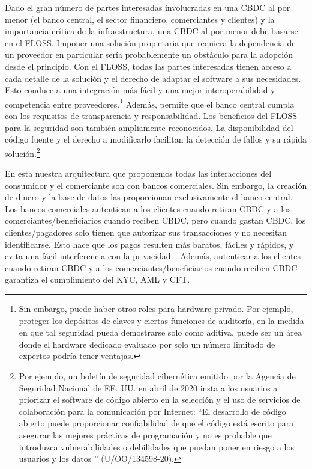 \documentclass[10pt,spanish]{article}
\begin{document}
Dado el gran número de partes interesadas involucradas en una CBDC al
por menor (el banco central, el sector financiero, comerciantes y
clientes) y la importancia crítica de la infraestructura, una CBDC al
por menor debe basarse en el FLOSS. Imponer una solución propietaria que
requiera la dependencia de un proveedor en particular sería
probablemente un obstáculo para la adopción desde el principio. Con el
FLOSS, todas las partes interesadas tienen acceso a cada detalle de la
solución y el derecho de adaptar el software a sus necesidades. Esto
conduce a una integración más fácil y una mejor interoperabilidad y
competencia entre proveedores.\footnote{Sin embargo, puede haber otros
roles para hardware privado. Por ejemplo, proteger los depósitos de
claves y ciertas funciones de auditoría, en la medida en que tal
seguridad pueda demostrarse solo como aditiva, puede ser un área donde
el hardware dedicado evaluado por solo un número limitado de expertos
podría tener ventajas.} Además, permite que el banco central cumpla
con los requisitos de transparencia y responsabilidad. Los beneficios
del FLOSS para la seguridad son también ampliamente reconocidos. La
disponibilidad del código fuente y el derecho a modificarlo facilitan la
detección de fallos y su rápida solución.\footnote{Por ejemplo, un
boletín de seguridad cibernética emitido por la Agencia de Seguridad
Nacional de EE. UU. en abril de 2020 insta a los usuarios a priorizar
el software de código abierto en la selección y el uso de servicios de
colaboración para la comunicación por Internet: ``El desarrollo de
código abierto puede proporcionar confiabilidad de que el código está
escrito para asegurar las mejores prácticas de programación y no es
probable que introduzca vulnerabilidades o debilidades que puedan
poner en riesgo a los usuarios y los datos '' (U/OO/134598-20).}

En esta nuestra arquitectura que proponemos todas las interacciones del
consumidor y el comerciante son con bancos comerciales. Sin embargo, la
creación de dinero y la base de datos las proporcionan exclusivamente el
banco central. Los bancos comerciales autentican a los clientes cuando
retiran CBDC y a los comerciantes/beneficiarios cuando reciben CBDC,
pero cuando gastan CBDC, los clientes/pagadores solo tienen que
autorizar sus transacciones y no necesitan identificarse. Esto hace que
los pagos resulten más baratos, fáciles y rápidos, y evita una fácil
interferencia con la privacidad~\cite{Dold}. Además, autenticar a los
clientes cuando retiran CBDC y a los comerciantes/beneficiarios cuando
reciben CBDC garantiza el cumplimiento del KYC, AML y CFT.
\end{document}

